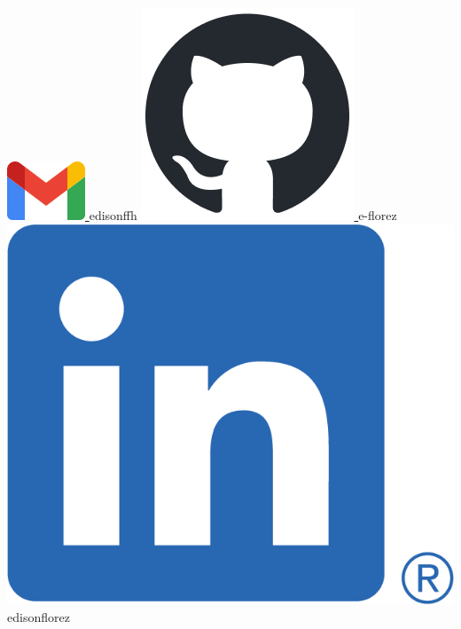 \begin{center}
    \href{mailto:edisonffh@gmail.com}{
        \includegraphics[scale=0.25]{figs/gmail_icon.png}
    } edisonffh
    \hspace*{5mm}
    \href{https://github.com/e-florez}{
        \includegraphics[scale=0.3]{figs/github-mark.png}
    } e-florez
    \hspace*{5mm}
    \href{https://www.linkedin.com/in/edisonflorez/}{
        \includegraphics[scale=0.1]{figs/linkedin_bug.png}
    } edisonflorez
    \hspace*{5mm}

\end{center}

